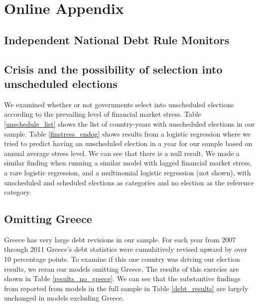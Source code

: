 \documentclass[]{article}
\begin{document}
\section*{Online Appendix}

\subsection*{Independent National Debt Rule Monitors}



\subsection*{Crisis and the possibility of selection into unscheduled elections}

We examined whether or not governments select into unscheduled elections according to the prevailing level of financial market stress. Table \ref{unschedule_list} shows the list of country-years with unscheduled elections in our sample. Table \ref{finstress_endog} shows results from a logistic regression where we tried to predict having an unscheduled election in a year for our sample based on annual average stress level. We can see that there is a null result. We made a similar finding when running a similar model with lagged financial market stress, a rare logistic regression, and a  multinomial logistic regression (not shown), with unscheduled and scheduled elections as categories and no election as the reference category.





\subsection*{Omitting Greece}

Greece has very large debt revisions in our sample. For each year from 2007 through 2011 Greece's debt statistics were cumulatively revised upward by over 10 percentage points. To examine if this one country was driving our election results, we reran our models omitting Greece. The results of this exercise are shown in Table \ref{results_no_greece}. We can see that the substantive findings from reported from models in the full sample in Table \ref{debt_results} are largely unchanged in models excluding Greece.

\begin{landscape}
    
\end{landscape}
\end{document}
